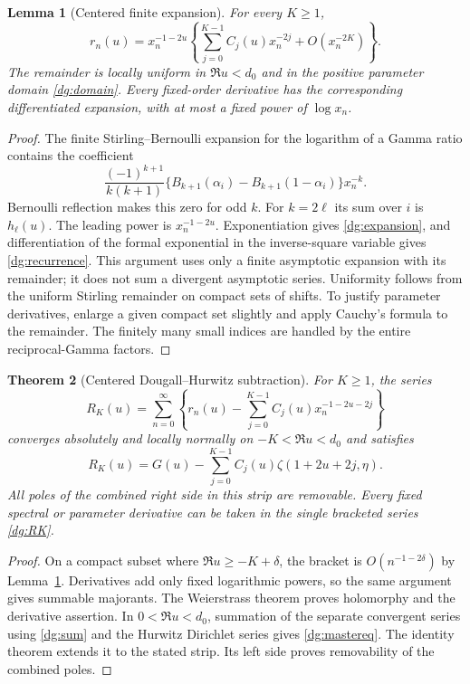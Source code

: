 \documentclass[11pt,a4paper]{article}
\numberwithin{equation}{section}
\newtheorem{theorem}{Theorem}[section]
\newtheorem{lemma}[theorem]{Lemma}
\theoremstyle{definition}
\theoremstyle{remark}
\begin{document}
\begin{lemma}[Centered finite expansion]\label{dg:asymptotic}
For every $K\ge1$,
\begin{equation}\label{dg:expansion}
 r_n(u)=x_n^{-1-2u}
 \left\{\sum_{j=0}^{K-1}C_j(u)x_n^{-2j}+O(x_n^{-2K})\right\}.
\end{equation}
The remainder is locally uniform in $\Re u<d_0$ and in the positive
parameter domain \eqref{dg:domain}. Every fixed-order derivative has
the corresponding differentiated expansion, with at most a fixed
power of $\log x_n$.
\end{lemma}
\begin{proof}
The finite Stirling--Bernoulli expansion for the logarithm of a Gamma
ratio \cite[Section 5.11]{dlmf-gamma} contains the coefficient
\[
 \frac{(-1)^{k+1}}{k(k+1)}
 \{B_{k+1}(\alpha_i)-B_{k+1}(1-\alpha_i)\}x_n^{-k}.
\]
Bernoulli reflection makes this zero for odd $k$. For $k=2\ell$ its
sum over $i$ is $h_\ell(u)$. The leading power is $x_n^{-1-2u}$.
Exponentiation gives \eqref{dg:expansion}, and differentiation of the
formal exponential in the inverse-square variable gives
\eqref{dg:recurrence}. This argument uses only a finite asymptotic
expansion with its remainder; it does not sum a divergent asymptotic
series. Uniformity follows from the uniform Stirling remainder on
compact sets of shifts. To justify parameter derivatives, enlarge a
given compact set slightly and apply Cauchy's formula to the remainder.
The finitely many small indices are handled by the entire
reciprocal-Gamma factors.
\end{proof}

\begin{theorem}[Centered Dougall--Hurwitz subtraction]\label{dg:master}
For $K\ge1$, the series
\begin{equation}\label{dg:RK}
 R_K(u)=\sum_{n=0}^{\infty}\left\{r_n(u)-
    \sum_{j=0}^{K-1}C_j(u)x_n^{-1-2u-2j}\right\}
\end{equation}
converges absolutely and locally normally on $-K<\Re u<d_0$ and satisfies
\begin{equation}\label{dg:mastereq}
 \boxed{R_K(u)=G(u)-
       \sum_{j=0}^{K-1}C_j(u)\zeta(1+2u+2j,\eta).}
\end{equation}
All poles of the combined right side in this strip are removable.
Every fixed spectral or parameter derivative can be taken in the
single bracketed series \eqref{dg:RK}.
\end{theorem}
\begin{proof}
On a compact subset where $\Re u\ge-K+\delta$, the bracket is
$O(n^{-1-2\delta})$ by Lemma~\ref{dg:asymptotic}. Derivatives add only
fixed logarithmic powers, so the same argument gives summable
majorants. The Weierstrass theorem proves holomorphy and the derivative
assertion. In $0<\Re u<d_0$, summation of the separate convergent
series using \eqref{dg:sum} and the Hurwitz Dirichlet series gives
\eqref{dg:mastereq}. The identity theorem extends it to the stated
strip. Its left side proves removability of the combined poles.
\end{proof}
\end{document}
